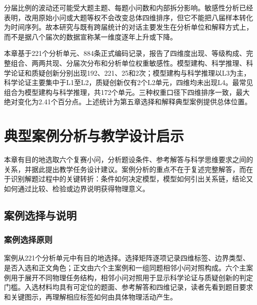 \documentclass[
  12pt,
  a4paper,twoside,openany]{ctexbook}
\begin{document}
分届比例的波动还可能受大题主题、每题小问数和内部拆分影响。敏感性分析已经表明，改用原始小问或大题等权不会改变总体四维排序，但它不能把八届样本转化为时间序列。故本研究与既有跨届统计的对话主要发生在分析单位和解释方式上，而不是据八个届次的数据宣称某一维度逐年上升或下降。

本章基于221个分析单元、884条正式编码记录，报告了四维度出现、等级构成、完整组合、两两共现、分届次分布和分析单位权重敏感性。模型建构、科学推理、科学论证和质疑创新分别出现192、221、25和2次；模型建构与科学推理以L3为主，科学论证主要集中于L1至L2，质疑创新仅有2个L2单元，四维均未出现L4。最常见组合为模型建构与科学推理，共172个单元。三种权重口径下四维排序一致，最大绝对变化为2.41个百分点。上述统计为第五章选择和解释典型案例提供总体位置。

\chapter{典型案例分析与教学设计启示}\label{ux5178ux578bux6848ux4f8bux5206ux6790ux4e0eux6559ux5b66ux8bbeux8ba1ux542fux793a}

本章有目的地选取六个复赛小问，分析题设条件、参考解答与科学思维要求之间的关系，并据此提出教学任务设计建议。案例分析的重点不在于复述完整解答，而在于识别解题过程中的关键转折：条件如何决定模型，模型如何引出关系链，结论又如何通过比较、检验或边界说明获得物理意义。

\section{案例选择与说明}\label{ux6848ux4f8bux9009ux62e9ux4e0eux8bf4ux660e}

\subsection{案例选择原则}\label{ux6848ux4f8bux9009ux62e9ux539fux5219}

案例从221个分析单元中有目的地选择。选择矩阵逐项记录四维标签、边界类型、是否入选和正文角色；正文由六个主案例和一组同题相邻小问对照构成。六个主案例用于展开不同物理任务结构，相邻小问对照用于显示科学论证与质疑创新的判定门槛。入选材料均具有可定位的题面、参考解答和四维记录，读者先看到题目要求和关键图示，再理解相应标签如何由具体物理活动产生。
\end{document}
